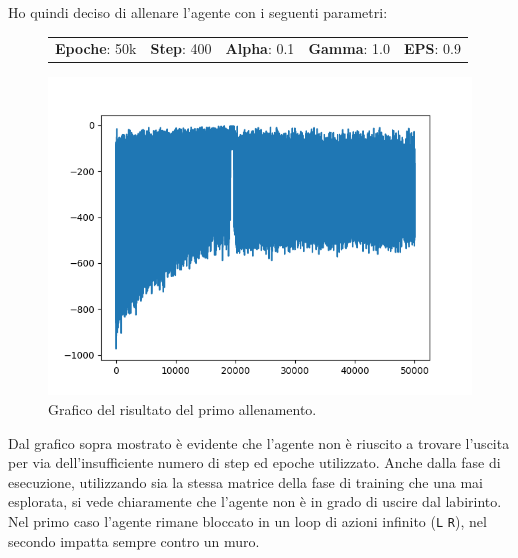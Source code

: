 Ho quindi deciso di allenare l'agente con i seguenti parametri:

\begin{figure}[H]
	\centering
	\begin{tabular}{c | c | c | c | c}
		\textbf{Epoche}: 50k & \textbf{Step}: 400 & \textbf{Alpha}: 0.1 & \textbf{Gamma}: 1.0 & \textbf{EPS}: 0.9\\
	\end{tabular}
\end{figure}

\begin{figure}[H]
	\centering
	\includegraphics[width=.6\textwidth]{img/primo_allenamento.png}
	\caption{Grafico del risultato del primo allenamento.}
\end{figure}

Dal grafico sopra mostrato \`{e} evidente che l'agente non \`{e} riuscito a trovare l'uscita per via dell'insufficiente numero di step ed epoche utilizzato. Anche dalla fase di esecuzione,  utilizzando sia la stessa matrice della fase di training che una mai esplorata, si vede chiaramente che l'agente non \`{e} in grado di uscire dal labirinto. Nel primo caso l'agente rimane bloccato in un loop di azioni infinito (\lstinline[style=cmd]|L| \lstinline[style=cmd]|R|), nel secondo impatta sempre contro un muro.


